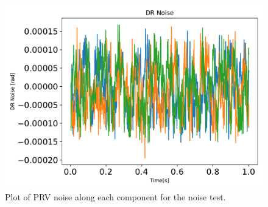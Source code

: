 \begin{figure}[htbp]\centerline{\includegraphics[height=0.7\textwidth, keepaspectratio]{AutoTeX/DRnoise}}\caption{Plot of PRV noise along each component for the noise test.}\label{fig:DRnoise}\end{figure}